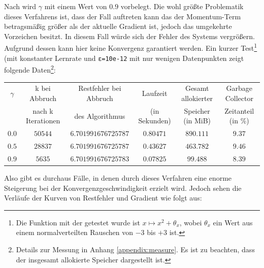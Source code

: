 \documentclass{article}
\theoremstyle{plain} %
\theoremstyle{definition} %
\begin{document}
Nach \cite[S. 110]{Lippe} wird $\gamma$ mit einem Wert von $0.9$ vorbelegt. Die wohl größte Problematik dieses Verfahrens ist, dass der Fall auftreten kann das der Momentum-Term betragsmäßig größer als der aktuelle Gradient ist, jedoch das umgekehrte Vorzeichen besitzt. In diesem Fall würde sich der Fehler des Systems vergrößern. Aufgrund dessen kann hier keine Konvergenz garantiert werden.
Ein kurzer Test\footnote{Die Funktion mit der getestet wurde ist $x \mapsto x^2+\theta_x$, wobei $\theta_x$ ein Wert aus einem normalverteilten Rauschen von $-3$ bis $+3$ ist.} (mit konstanter Lernrate und \texttt{ε=10e-12} mit nur wenigen Datenpunkten zeigt folgende Daten\footnote{Details zur Messung in Anhang \ref{appendix:measure}. Es ist zu beachten, dass der insgesamt allokierte Speicher dargestellt ist.}:

\begin{center}
  \begin{tabular}{cccccc}
    \toprule
    $\gamma$ & k bei Abbruch & Restfehler bei Abbruch & Laufzeit & Gesamt allokierter & Garbage Collector\\
    &  nach k Iterationen & des Algorithmus & (in Sekunden) & Speicher (in MiB) & Zeitanteil (in \%) \\
    \midrule
    $0.0$ & $50544$ & $6.701991676725787$ & $0.80471$ & $890.111$ & $9.37$ \\
    $0.5$ & $28837$ & $6.701991676725787$ & $0.43627$ & $463.782$ & $9.46$ \\
    $0.9$ & $5635$ & $6.701991676725783$ & $0.07825$ & $99.488$ & $8.39$ \\
  \end{tabular}
\end{center}

Also gibt es durchaus Fälle, in denen durch dieses Verfahren eine enorme Steigerung bei der Konvergenzgeschwindigkeit erzielt wird. Jedoch sehen die Verläufe der Kurven von Restfehler und Gradient wie folgt aus:
\end{document}
